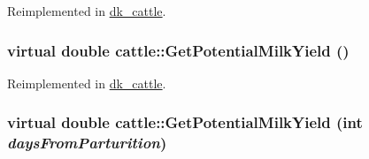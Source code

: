 Reimplemented in \hyperlink{classdk__cattle_ac3beb86fb1736f85fc2330f31bb5bfee}{dk\_\-cattle}.\hypertarget{classcattle_a325c1edad49aee895e01d87f0c44bf64}{
\subsubsection[{GetPotentialMilkYield}]{\setlength{\rightskip}{0pt plus 5cm}virtual double cattle::GetPotentialMilkYield ()}}
\label{classcattle_a325c1edad49aee895e01d87f0c44bf64}


Reimplemented in \hyperlink{classdk__cattle_aba7df82a62a25f831a662e6377f97224}{dk\_\-cattle}.\hypertarget{classcattle_ab885604f6912a5bfadc8a71d42e72328}{
\subsubsection[{GetPotentialMilkYield}]{\setlength{\rightskip}{0pt plus 5cm}virtual double cattle::GetPotentialMilkYield (int {\em daysFromParturition})}}
\label{classcattle_ab885604f6912a5bfadc8a71d42e72328}


